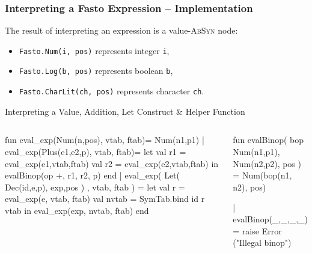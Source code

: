 \documentclass{beamer}
\renewcommand{\emph}[1]{\textcolor{structure}{#1}}
\newcommand{\emp}[1]{\textcolor{DikuRed}{ #1}}
\newcommand{\emphh}[1]{\textcolor{CosGreen}{ #1}}
\begin{document}
\begin{frame}[fragile, t]
\frametitle{Interpreting a Fasto Expression -- Implementation}

The result of interpreting an expression is a value-\textsc{AbSyn} node:
\smallskip

\begin{itemize}
    \item {\tt Fasto.Num(i, pos)} represents integer {\tt i},
    \item {\tt Fasto.Log(b, pos)} represents boolean {\tt b},
    \item {\tt Fasto.CharLit(ch, pos)} represents character {\tt ch}.
\end{itemize}

\bigskip

\begin{block}{Interpreting a Value, Addition, Let Construct \& Helper Function}
\begin{columns}
\vspace{-2ex}
\begin{colorcode}[fontsize=\scriptsize]
fun \emphh{eval\_exp}(Num(n,pos), vtab, ftab)=
      Num(n1,p1)
  | \emphh{eval\_exp}(Plus(e1,e2,p), vtab, ftab)=
      let val r1 = \emphh{eval\_exp}(e1,vtab,ftab)
          val r2 = \emphh{eval\_exp}(e2,vtab,ftab)
      in \emp{evalBinop}(op +, r1, r2, p)
      end
  | \emph{eval\_exp}( Let( Dec(id,e,p), exp,pos )
               , vtab, ftab ) =
      let val r = \emphh{eval\_exp}(e, vtab, ftab)
          val nvtab = SymTab.bind id r vtab
      in \emphh{eval\_exp}(exp, nvtab, ftab)
      end
\end{colorcode} 
\vspace{-2ex}
\begin{colorcode}[fontsize=\scriptsize]
fun \emp{evalBinop}( bop
               Num(n1,p1),
               Num(n2,p2),
               pos
              )          =
      Num(bop(n1, n2), pos)

  | \emp{evalBinop}(_,_,_,_) =
      raise Error
          ("Illegal binop")
\end{colorcode}
\end{columns}

\end{block}

\end{frame}
\end{document}
